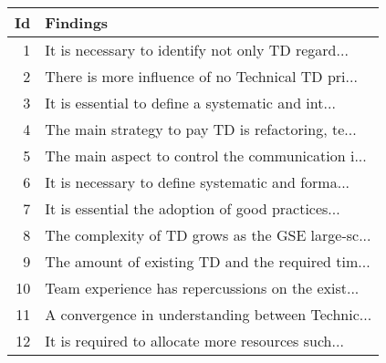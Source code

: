 \begin{tabular}{rl}
\toprule
 Id &                                           Findings \\
\midrule
  1 &  It is necessary to identify not only TD regard... \\
  2 &  There is more influence of no Technical TD pri... \\
  3 &  It is essential to define a systematic and int... \\
  4 &  The main strategy to pay TD is refactoring, te... \\
  5 &  The main aspect to control the communication i... \\
  6 &  It is necessary to define systematic and forma... \\
  7 &  It is essential the adoption of good practices... \\
  8 &  The complexity of TD grows as the GSE large-sc... \\
  9 &  The amount of existing TD and the required tim... \\
 10 &  Team experience has repercussions on the exist... \\
 11 &  A convergence in understanding between Technic... \\
 12 &  It is required to allocate more resources such... \\
\bottomrule
\end{tabular}
